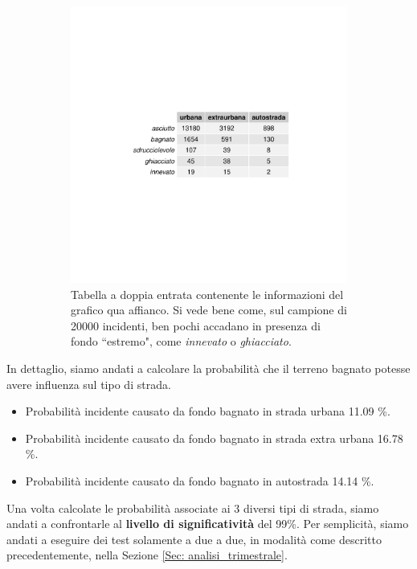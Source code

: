 \documentclass[12pt,a4paper,final,oneside]{article}			%
\begin{document}
\begin{figure}[h]
\begin{subfigure}{0.4\textwidth}
                \includegraphics[scale=0.4]{../results/tabella_localizzazione_incidenti.pdf}
                \caption{Tabella a doppia entrata contenente le informazioni del grafico qua affianco. Si vede bene come, sul campione di 20000 incidenti, ben pochi accadano in presenza di fondo ``estremo", come \textit{innevato} o \textit{ghiacciato}.}
                \label{Fig: tabella_fondo_tipo}
            \end{subfigure}
            \caption{}
        \end{figure} 
        In dettaglio, siamo andati a calcolare la probabilità che il terreno bagnato potesse avere influenza sul tipo di strada. 
        \begin{itemize}
            \item Probabilità incidente causato da fondo bagnato in strada urbana 11.09 \%. 
            \item Probabilità incidente causato da fondo bagnato in strada extra urbana 16.78 \%.
            \item Probabilità incidente causato da fondo bagnato in autostrada 14.14 \%.
        \end{itemize}
        Una volta calcolate le probabilità associate ai 3 diversi tipi di strada, siamo andati a confrontarle al \textbf{livello di significatività} del 99\%. Per semplicità, siamo andati a eseguire dei test solamente a due a due, in modalità come descritto precedentemente, nella Sezione \ref{Sec: analisi_trimestrale}.
        
\end{document}
